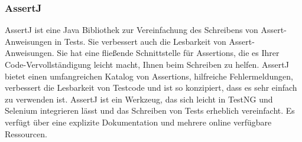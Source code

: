 \subsubsection{AssertJ}

AssertJ ist eine Java Bibliothek zur Vereinfachung des Schreibens von
Assert-Anweisungen in Tests. Sie verbessert auch die Lesbarkeit von
Assert-Anweisungen. Sie hat eine fließende Schnittstelle für Assertions,
die es Ihrer Code-Vervollständigung leicht macht, Ihnen beim Schreiben
zu helfen. AssertJ bietet einen umfangreichen Katalog von Assertions,
hilfreiche Fehlermeldungen, verbessert die Lesbarkeit von Testcode und
ist so konzipiert, dass es sehr einfach zu verwenden ist. AssertJ ist
ein Werkzeug, das sich leicht in TestNG und Selenium integrieren lässt
und das Schreiben von Tests erheblich vereinfacht. Es verfügt über eine
explizite Dokumentation und mehrere online verfügbare Ressourcen.
